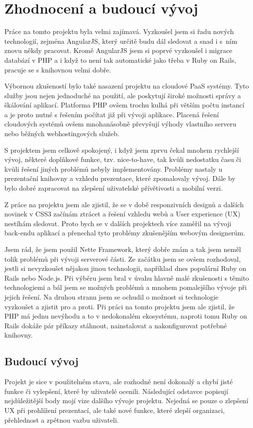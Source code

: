 \documentclass[11pt,twoside,a4paper]{book}
\newcommand*{\nomExpl}[2]{#2 (#1)\nomenclature{#1}{#2}} 	%
\begin{document}
\chapter{Zhodnocení a budoucí vývoj}
Práce na tomto projektu byla velmi zajímavá. Vyzkoušel jsem si řadu nových technologií, zejména AngularJS, který určitě budu dál sledovat a snad i s~ním znovu někdy pracovat. Kromě AngularJS jsem si poprvé vyzkoušel i migrace databází v PHP a i když to není tak automatické jako třeba v Ruby on Rails, pracuje se s knihovnou velmi dobře.

Výbornou zkušeností bylo také nasazení projektu na cloudové PaaS systémy. Tyto služby jsou nejen jednoduché na použití, ale poskytují široké možnosti správy a škálování aplikací. Platforma PHP ovšem trochu kulhá při větším počtu instancí a je proto nutné s řešením počítat již při vývoji aplikace. Placená řešení cloudových systémů ovšem mnohanásobně převyšují výhody vlastního serveru nebo běžných webhostingových služeb.

S projektem jsem celkově spokojený, i když jsem zprvu čekal mnohem rychlejší vývoj, některé doplňkové funkce, tzv. nice-to-have, tak kvůli nedostatku času či kvůli řešení jiných problémů nebyly implementovány. Problémy nastaly u prezentační knihovny a vzhledu prezentace, které zpomalovaly vývoj. Dále by bylo dobré zapracovat na zlepšení uživatelské přívětivosti a mobilní verzi.

Z práce na projektu jsem ale zjistil, že se v době responzivních designů a dalších novinek v CSS3 začínám ztrácet a řešení vzhledu webů a \nomExpl{UX}{User experience} nestíhám sledovat. Proto bych se v dalších projektech více zaměřil na vývoji back-endu aplikací a přenechal tyto problémy zkušenějším webovým designerům.

Jsem rád, že jsem použil Nette Framework, který dobře znám a tak jsem neměl tolik problémů při vývoji serverové části. Ze začátku jsem se ovšem rozhodoval, jestli si nevyzkoušet nějakou jinou technologii, například dnes populární Ruby on Rails nebo Node.js. Při výběru jsem bral v úvahu hlavně malé zkušenosti s těmito technologiemi a bál jsem se možných problémů a mnohem pomalejšího vývoje při jejich řešení. Na druhou stranu jsem se ochudil o možnost si technologie vyzkoušet a zjistit pro a proti. Při práci na tomto projektu jsem ale zjistil, že PHP má jednu nevýhodu a to v nedokonalém ekosystému, naproti tomu Ruby on Rails dokáže pár příkazy stáhnout, nainstalovat a nakonfigurovat potřebné knihovny.

\section{Budoucí vývoj}
Projekt je sice v použitelném stavu, ale rozhodně není dokonalý a chybí jisté funkce či vylepšení, které by uživatelé ocenili. Následující odstavce popisují nejdůležitější body mojí vize dalšího vývoje projektu. Nejedná se pouze o zlepšení UX při prohlížení prezentací, ale také nové funkce, které zlepší organizaci, přehlednost a zpětnou vazbu uživateli.
\end{document}
